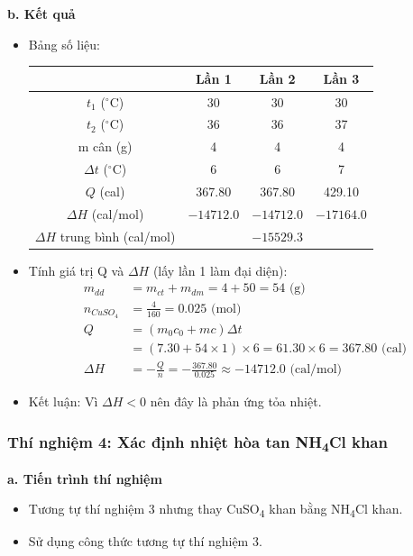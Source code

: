 \textbf{b. Kết quả}
\begin{itemize}
    \item Bảng số liệu:
    \begin{table}[H]
        \centering
        \begin{tabular}{|c|c|c|c|}
            \hline
            & \textbf{Lần 1} & \textbf{Lần 2} & \textbf{Lần 3} \\
            \hline
            $t_1$ ($^\circ$C) & 30 & 30 & 30 \\
            \hline
            $t_2$ ($^\circ$C) & 36 & 36 & 37 \\
            \hline
            m cân (g) & 4 & 4 & 4 \\
            \hline
            $\Delta t$ ($^\circ$C) & 6 & 6 & 7 \\
            \hline
            $Q$ (cal) & 367.80 & 367.80 & 429.10 \\
            \hline
            $\Delta H$ (cal/mol) & $-14712.0$ & $-14712.0$ & $-17164.0$ \\
            \hline
            $\Delta H$ trung bình (cal/mol) & \multicolumn{3}{c|}{$-15529.3$} \\
            \hline
        \end{tabular}
    \end{table}
    \item Tính giá trị Q và $\Delta H$ (lấy lần 1 làm đại diện):
    \begin{align*}
        m_{dd} &= m_{ct} + m_{dm} = 4 + 50 = 54 \text{ (g)} \\
        n_{CuSO_4} &= \frac{4}{160} = 0.025 \text{ (mol)} \\
        Q &= (m_0c_0 + mc)\Delta t \\
          &= (7.30 + 54 \times 1) \times 6 = 61.30 \times 6 = 367.80 \text{ (cal)} \\
        \Delta H &= -\frac{Q}{n} = -\frac{367.80}{0.025} \approx -14712.0 \text{ (cal/mol)}
    \end{align*}
    \item Kết luận: Vì $\Delta H < 0$ nên đây là phản ứng tỏa nhiệt.
\end{itemize}

\subsubsection{Thí nghiệm 4: Xác định nhiệt hòa tan NH\textsubscript{4}Cl khan}
\textbf{a. Tiến trình thí nghiệm}
\begin{itemize}
    \item Tương tự thí nghiệm 3 nhưng thay CuSO\textsubscript{4} khan bằng NH\textsubscript{4}Cl khan.
    \item Sử dụng công thức tương tự thí nghiệm 3.
\end{itemize}

